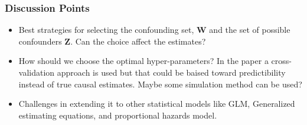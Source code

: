 \documentclass{beamer}
\begin{document}

% 
% 

\begin{frame}
	\frametitle{Discussion Points}
	\begin{itemize}
		\item Best strategies for selecting the confounding set, $
			\bm{W} $ and the set of possible confounders $ \bm{Z}
			$. Can the choice affect the estimates?
		\item How should we choose the optimal hyper-parameters? In the
			paper a cross-validation approach is used but that
			could be baised toward predictibility instead of true
			causal estimates. Maybe some simulation method can be
			used?
		\item Challenges in extending it to other statistical models
			like GLM, Generalized estimating equations, and
			proportional hazards model.
	\end{itemize}
\end{frame}
\end{document}
